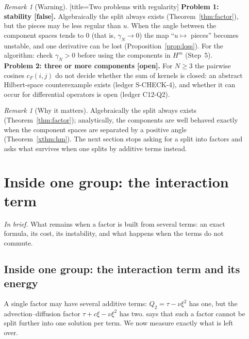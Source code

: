\documentclass[11pt]{article}
\theoremstyle{plain}
\theoremstyle{definition}
\theoremstyle{remark}
\newtheorem{remark}[theorem]{Remark}
\newcommand{\inbrief}[1]{\par\smallskip\noindent\emph{In brief.} #1\par\smallskip}
\newcommand{\badge}[2]{\textcolor{#1}{\textsf{\footnotesize[#2]}}}
\newcommand{\openq}{\badge{cB}{open}}
\newcommand{\falsest}{\badge{cB}{false}}
\newcommand{\led}[1]{\textcolor{cG}{\textsf{\footnotesize(ledger #1)}}}
\newenvironment{caution}{\begin{remark}[Warning]}{\end{remark}}
\newenvironment{takeaway}{\begin{remark}[Why it matters]}{\end{remark}}
\begin{document}
\begin{caution}[title=Two problems with regularity]
\textbf{Problem 1: stability \falsest.} Algebraically the split always exists (Theorem~\ref{thm:factor}), but the pieces may be less regular than $u$. When the angle between the component spaces tends to $0$ (that is, $\gamma_N\to0$) the map ``$u\mapsto$ pieces'' becomes unstable, and one derivative can be lost (Proposition~\ref{prop:loss}). For the algorithm: check $\gamma_N>0$ before using the components in $H^m$ (Step~5).\\[3pt]
\textbf{Problem 2: three or more components \openq.} For $N\ge3$ the pairwise cosines $c_F(i,j)$ do not decide whether the sum of kernels is closed: an abstract Hilbert-space counterexample exists \led{S-CHECK-4}, and whether it can occur for differential operators is open \led{C12-Q2}.
\end{caution}

\begin{takeaway}
Algebraically the split always exists (Theorem~\ref{thm:factor}); analytically, the components are well behaved exactly when the component spaces are separated by a positive angle (Theorem~\ref{xthm:hm}). The next section stops asking for a split into factors and asks what survives when one splits by additive terms instead.
\end{takeaway}




\section{Inside one group: the interaction term}\label{sec:inside}\label{ch:interaction}
\inbrief{What remains when a factor is built from several terms: an exact formula, its cost, its instability, and what happens when the terms do not commute.}

\subsection{Inside one group: the interaction term and its energy}\label{sec:eint}
A single factor may have several additive terms: $Q_2=\tau-\nu\xi^2$ has one, but the advection--diffusion
factor $\tau+c\xi-\nu\xi^2$ has two.  says that such a factor cannot be split further
into one solution per term. We now measure exactly what is left over.
\end{document}
